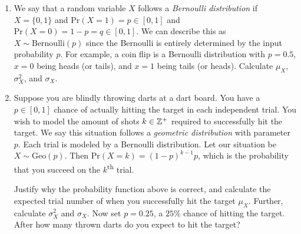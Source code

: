 \documentclass[main.tex]{subfiles}
\begin{document}
\begin{enumerate}
	\item We say that a random variable \(X\) follows a \textit{Bernoulli distribution} if \(X = \{0,1\}\) and \(\mathrm{Pr}(X = 1) = p \in [0,1]\) and \(\mathrm{Pr}(X = 0) = 1-p = q \in [0,1]\). We can describe this as \(X \sim \text{Bernoulli}(p)\) since the Bernoulli is entirely determined by the input probability \(p\). For example, a coin flip is a Bernoulli distribution with \(p=0.5\), \(x=0\) being heads (or tails), and \(x=1\) being tails (or heads). Calculate \(\mu_X\), \(\sigma_X^2\), and \(\sigma_X\).
	
	\item Suppose you are blindly throwing darts at a dart board. You have a \(p \in [0,1]\) chance of actually hitting the target in each independent trial. You wish to model the amount of shots \(k \in \mathbb{Z}^+\) required to successfully hit the target. We say this situation follows a \textit{geometric distribution} with parameter \(p\). Each trial is modeled by a Bernoulli distribution. Let our situation be \(X \sim \text{Geo}(p)\). Then \(\mathrm{Pr}(X = k) = (1-p)^{k-1}p\), which is the probability that you succeed on the \(k\)\textsuperscript{th} trial.
	
	Justify why the probability function above is correct, and calculate the expected trial number of when you successfully hit the target \(\mu_X\). Further, calculate \(\sigma_X^2\) and \(\sigma_X\). Now set \(p=0.25\), a \(25\%\) chance of hitting the target. After how many thrown darts do you expect to hit the target?
\end{enumerate}
\end{document}
